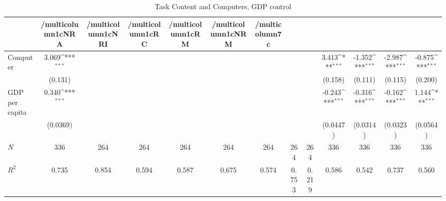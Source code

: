 \begin{table}[htbp]\centering
\def\sym#1{\ifmmode^{#1}\else\(^{#1}\)\fi}
\caption{Task Content and Computers, GDP control}
\begin{tabular}{l*{12}{c}}
\hline\hline
            &/multicolumn{1}{c}{NRA}&/multicolumn{1}{c}{NRI}&/multicolumn{1}{c}{RC}&/multicolumn{1}{c}{RM}&/multicolumn{1}{c}{NRM}&/multicolumn{7}{c}{}                                                                                                                                     \\
\hline
Computer    &       3.069\sym{***}&                     &                     &                     &                     &                     &                     &                     &       3.413\sym{***}&      -1.352\sym{***}&      -2.987\sym{***}&      -0.875\sym{***}\\
            &     (0.131)         &                     &                     &                     &                     &                     &                     &                     &     (0.158)         &     (0.111)         &     (0.115)         &     (0.200)         \\
[1em]
GDP per capita&       0.340\sym{***}&                     &                     &                     &                     &                     &                     &                     &      -0.243\sym{***}&      -0.316\sym{***}&      -0.162\sym{***}&       1.144\sym{***}\\
            &    (0.0369)         &                     &                     &                     &                     &                     &                     &                     &    (0.0447)         &    (0.0314)         &    (0.0323)         &    (0.0564)         \\
\hline
\(N\)       &         336         &         264         &         264         &         264         &         264         &         264         &         264         &         264         &         336         &         336         &         336         &         336         \\
\(R^{2}\)   &       0.735         &       0.854         &       0.594         &       0.587         &       0.675         &       0.574         &       0.753         &       0.219         &       0.586         &       0.542         &       0.737         &       0.560         \\
\hline\hline
\end{tabular}
\end{table}
